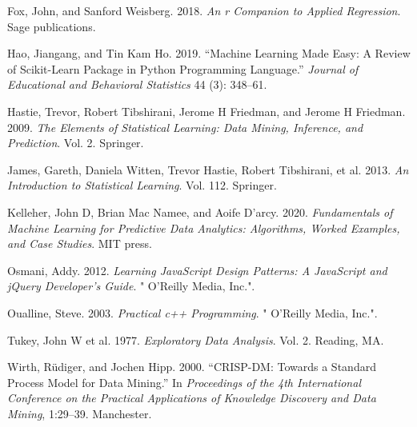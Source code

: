 \documentclass[
  letterpaper,
  DIV=11,
  numbers=noendperiod]{scrreprt}
\newlength{\cslhangindent}
\newlength{\cslentryspacingunit} %
\newenvironment{CSLReferences}[2] %
 {%
  \setlength{\parindent}{0pt}
  \ifodd #1
  \let\oldpar\par
  \def\par{\hangindent=\cslhangindent\oldpar}
  \fi
  \setlength{\parskip}{#2\cslentryspacingunit}
 }%
 {}
\begin{document}
\hypertarget{refs}{}
\begin{CSLReferences}{1}{0}
\leavevmode{}%
Fox, John, and Sanford Weisberg. 2018. \emph{An r Companion to Applied
Regression}. Sage publications.

\leavevmode{}%
Hao, Jiangang, and Tin Kam Ho. 2019. {``Machine Learning Made Easy: A
Review of Scikit-Learn Package in Python Programming Language.''}
\emph{Journal of Educational and Behavioral Statistics} 44 (3): 348--61.

\leavevmode{}%
Hastie, Trevor, Robert Tibshirani, Jerome H Friedman, and Jerome H
Friedman. 2009. \emph{The Elements of Statistical Learning: Data Mining,
Inference, and Prediction}. Vol. 2. Springer.

\leavevmode{}%
James, Gareth, Daniela Witten, Trevor Hastie, Robert Tibshirani, et al.
2013. \emph{An Introduction to Statistical Learning}. Vol. 112.
Springer.

\leavevmode{}%
Kelleher, John D, Brian Mac Namee, and Aoife D'arcy. 2020.
\emph{Fundamentals of Machine Learning for Predictive Data Analytics:
Algorithms, Worked Examples, and Case Studies}. MIT press.

\leavevmode{}%
Osmani, Addy. 2012. \emph{Learning JavaScript Design Patterns: A
JavaScript and jQuery Developer's Guide}. " O'Reilly Media, Inc.".

\leavevmode{}%
Oualline, Steve. 2003. \emph{Practical c++ Programming}. " O'Reilly
Media, Inc.".

\leavevmode{}%
Tukey, John W et al. 1977. \emph{Exploratory Data Analysis}. Vol. 2.
Reading, MA.

\leavevmode{}%
Wirth, Rüdiger, and Jochen Hipp. 2000. {``CRISP-DM: Towards a Standard
Process Model for Data Mining.''} In \emph{Proceedings of the 4th
International Conference on the Practical Applications of Knowledge
Discovery and Data Mining}, 1:29--39. Manchester.

\end{CSLReferences}
\end{document}
